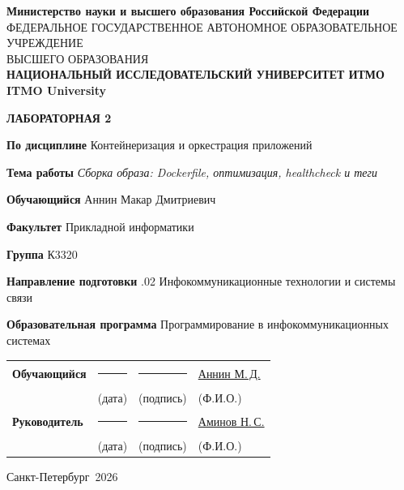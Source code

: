 \documentclass[14pt,a4paper,oneside]{extreport}
\newcommand{\LabNumber}{2}
\newcommand{\LabTitle}{Сборка образа: Dockerfile, оптимизация, healthcheck и теги}
\newcommand{\CourseName}{Контейнеризация и оркестрация приложений}
\newcommand{\StudentName}{Аннин Макар Дмитриевич}
\newcommand{\StudentShortName}{Аннин М.\,Д.}
\newcommand{\StudentGroup}{К3320}
\newcommand{\FacultyName}{Прикладной информатики}
\newcommand{\DegreeProgramme}{11.03.02 Инфокоммуникационные технологии и системы связи}
\newcommand{\EducationProgramme}{Программирование в инфокоммуникационных системах}
\newcommand{\TeacherName}{Аминов Н.\,С.}
\newcommand{\ReportCity}{Санкт-Петербург}
\newcommand{\ReportYear}{2026}
\begin{document}
\begin{titlepage}
  \thispagestyle{empty}
  \begin{center}
    \fontsize{11pt}{14pt}\selectfont
    \textbf{Министерство науки и высшего образования Российской Федерации}\\[0.8\baselineskip]
    {\fontsize{10pt}{14pt}\selectfont ФЕДЕРАЛЬНОЕ ГОСУДАРСТВЕННОЕ АВТОНОМНОЕ ОБРАЗОВАТЕЛЬНОЕ УЧРЕЖДЕНИЕ}\\
    ВЫСШЕГО ОБРАЗОВАНИЯ\\[0.45\baselineskip]
    \textbf{НАЦИОНАЛЬНЫЙ ИССЛЕДОВАТЕЛЬСКИЙ УНИВЕРСИТЕТ ИТМО}\\[0.35\baselineskip]
    \textbf{ITMO University}
  \end{center}

  \vspace{0.8\baselineskip}
  \noindent\textbf{ЛАБОРАТОРНАЯ \LabNumber}

  \vspace{0.6\baselineskip}
  \begingroup
  \fontsize{11.5pt}{15pt}\selectfont
  \setlength{\parindent}{0pt}
  \textbf{По дисциплине} \CourseName\par\medskip
  \textbf{Тема работы} \textit{\LabTitle}\par\medskip
  \textbf{Обучающийся} \StudentName\par\medskip
  \textbf{Факультет}\hspace{1.2cm} \FacultyName\par\medskip
  \textbf{Группа} \StudentGroup\par\medskip
  \parbox[t]{\textwidth}{\textbf{Направление подготовки} {\fontsize{10.5pt}{14pt}\selectfont \DegreeProgramme}}\par\medskip
  \parbox[t]{\textwidth}{\textbf{Образовательная программа} \EducationProgramme}\par
  \endgroup

  \vfill
  \begin{tabular}{@{}p{36mm}>{\centering\arraybackslash}p{28mm}>{\centering\arraybackslash}p{18mm}>{\centering\arraybackslash}p{55mm}@{}}
    \textbf{Обучающийся} & \rule{25mm}{0.4pt} & \rule{15mm}{0.4pt} & \underline{\StudentShortName}\\
    & {\fontsize{12pt}{14pt}\selectfont (дата)} & {\fontsize{12pt}{14pt}\selectfont (подпись)} & {\fontsize{12pt}{14pt}\selectfont (Ф.И.О.)}\\[0.7\baselineskip]
    \textbf{Руководитель} & \rule{25mm}{0.4pt} & \rule{15mm}{0.4pt} & \underline{\TeacherName}\\
    & {\fontsize{12pt}{14pt}\selectfont (дата)} & {\fontsize{12pt}{14pt}\selectfont (подпись)} & {\fontsize{12pt}{14pt}\selectfont (Ф.И.О.)}
  \end{tabular}

  \vfill
  \begin{center}
    \fontsize{12pt}{16pt}\selectfont
    \ReportCity\ \ReportYear
  \end{center}
\end{titlepage}

\setcounter{page}{2}
\tableofcontents

\end{document}
